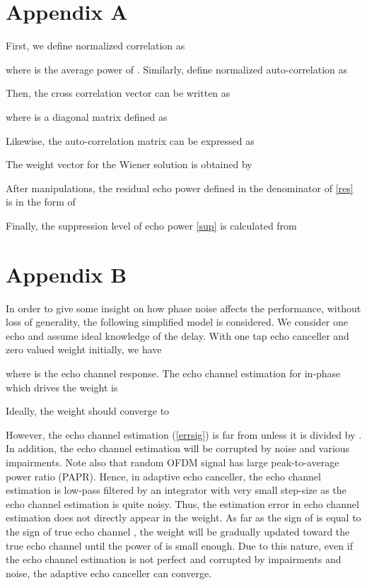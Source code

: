 \documentclass[twocolumn]{IEEEtran}
\begin{document}
\section*{Appendix A}

\setcounter{equation}{0}
\renewcommand{\theequation}{A.\arabic{equation}}

First, we define normalized correlation as


where  is the average power of . Similarly, define
normalized auto-correlation as



\noindent Then, the cross correlation vector can be written as


where  is a diagonal matrix defined as



\noindent Likewise, the auto-correlation matrix can be expressed as



The weight vector for the Wiener solution is obtained by



\noindent After manipulations, the residual echo power defined in
the denominator of \eqref{res} is in the form of



Finally, the suppression level of echo power \eqref{sup} is
calculated from





\section*{Appendix B}

\setcounter{equation}{0}
\renewcommand{\theequation}{B.\arabic{equation}}

In order to give some insight on how phase noise affects the
performance, without loss of generality, the following simplified
model is considered. We consider one echo and assume ideal knowledge
of the delay. With one tap echo canceller and zero valued weight
initially, we have


where  is the echo channel response. The echo
channel estimation for in-phase which drives the weight is


Ideally, the weight should converge to


However, the echo channel estimation (\ref{errsig}) is far from  unless it is divided by . In addition, the
echo channel estimation will be corrupted by noise and various
impairments. Note also that random OFDM signal  has large
peak-to-average power ratio (PAPR). Hence, in adaptive echo
canceller, the echo channel estimation is low-pass filtered by an
integrator with very small step-size  as the echo channel
estimation is quite noisy. Thus, the estimation error in echo
channel estimation does not directly appear in the weight. As far as
the sign of  is equal to the sign of true echo
channel , the weight will be gradually updated
toward the true echo channel until the power of  is small
enough. Due to this nature, even if the echo channel estimation is
not perfect and corrupted by impairments and noise, the adaptive
echo canceller can converge.
\end{document}
